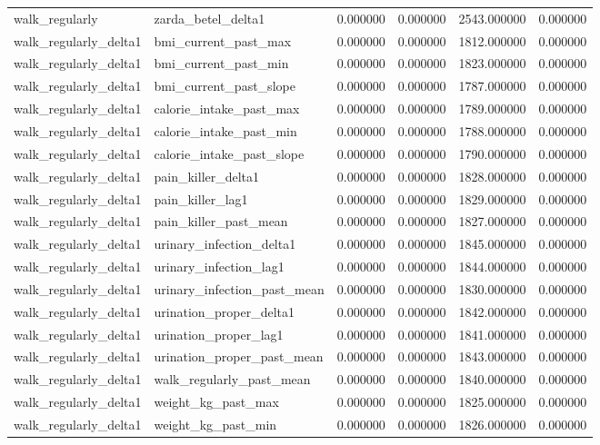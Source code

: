 \begin{longtable}{llrrrr}
walk\_regularly & zarda\_betel\_delta1 & 0.000000 & 0.000000 & 2543.000000 & 0.000000 \\
walk\_regularly\_delta1 & bmi\_current\_past\_max & 0.000000 & 0.000000 & 1812.000000 & 0.000000 \\
walk\_regularly\_delta1 & bmi\_current\_past\_min & 0.000000 & 0.000000 & 1823.000000 & 0.000000 \\
walk\_regularly\_delta1 & bmi\_current\_past\_slope & 0.000000 & 0.000000 & 1787.000000 & 0.000000 \\
walk\_regularly\_delta1 & calorie\_intake\_past\_max & 0.000000 & 0.000000 & 1789.000000 & 0.000000 \\
walk\_regularly\_delta1 & calorie\_intake\_past\_min & 0.000000 & 0.000000 & 1788.000000 & 0.000000 \\
walk\_regularly\_delta1 & calorie\_intake\_past\_slope & 0.000000 & 0.000000 & 1790.000000 & 0.000000 \\
walk\_regularly\_delta1 & pain\_killer\_delta1 & 0.000000 & 0.000000 & 1828.000000 & 0.000000 \\
walk\_regularly\_delta1 & pain\_killer\_lag1 & 0.000000 & 0.000000 & 1829.000000 & 0.000000 \\
walk\_regularly\_delta1 & pain\_killer\_past\_mean & 0.000000 & 0.000000 & 1827.000000 & 0.000000 \\
walk\_regularly\_delta1 & urinary\_infection\_delta1 & 0.000000 & 0.000000 & 1845.000000 & 0.000000 \\
walk\_regularly\_delta1 & urinary\_infection\_lag1 & 0.000000 & 0.000000 & 1844.000000 & 0.000000 \\
walk\_regularly\_delta1 & urinary\_infection\_past\_mean & 0.000000 & 0.000000 & 1830.000000 & 0.000000 \\
walk\_regularly\_delta1 & urination\_proper\_delta1 & 0.000000 & 0.000000 & 1842.000000 & 0.000000 \\
walk\_regularly\_delta1 & urination\_proper\_lag1 & 0.000000 & 0.000000 & 1841.000000 & 0.000000 \\
walk\_regularly\_delta1 & urination\_proper\_past\_mean & 0.000000 & 0.000000 & 1843.000000 & 0.000000 \\
walk\_regularly\_delta1 & walk\_regularly\_past\_mean & 0.000000 & 0.000000 & 1840.000000 & 0.000000 \\
walk\_regularly\_delta1 & weight\_kg\_past\_max & 0.000000 & 0.000000 & 1825.000000 & 0.000000 \\
walk\_regularly\_delta1 & weight\_kg\_past\_min & 0.000000 & 0.000000 & 1826.000000 & 0.000000 \\

\end{longtable}
